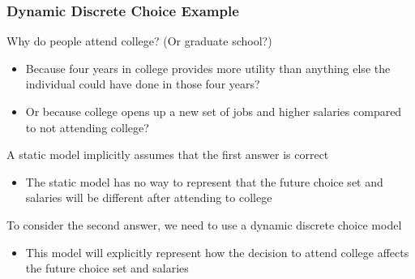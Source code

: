 \documentclass{beamer}
\begin{document}
\begin{frame}\frametitle{Dynamic Discrete Choice Example}
    Why do people attend college? (Or graduate school?)
    \begin{itemize}
        \item Because four years in college provides more utility than anything else the individual could have done in those four years?
        \item Or because college opens up a new set of jobs and higher salaries compared to not attending college?
    \end{itemize}
    \vspace{2ex}
    A static model implicitly assumes that the first answer is correct
    \begin{itemize}
        \item The static model has no way to represent that the future choice set and salaries will be different after attending to college
    \end{itemize}
    \vspace{2ex}
    To consider the second answer, we need to use a dynamic discrete choice model
    \begin{itemize}
        \item This model will explicitly represent how the decision to attend college affects the future choice set and salaries
    \end{itemize}
\end{frame}
\end{document}
